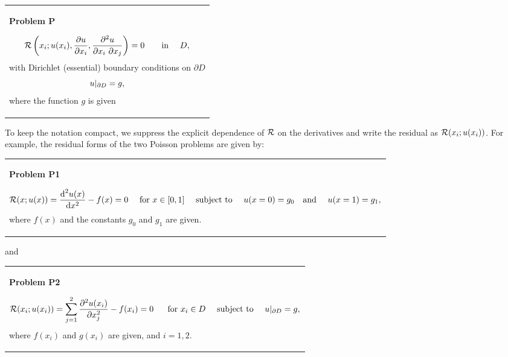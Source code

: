 \begin{center} \tabulinesep=1mm
\begin{longtabu} spread 0pt [c]{*{1}{|X[-1]}|}
\hline
\begin{center} {\bfseries  Problem P } \end{center} 

\begin{center} \[ {\cal R}\left(x_i; u(x_i), \frac{\partial u}{\partial x_i}, \frac{\partial^2 u}{\partial x_i \ \partial x_j}\right) = 0 \ \mbox{ \ \ \ \ in \ \ \ } D,\] with Dirichlet (essential) boundary conditions on $ \partial D $ \[ \hfill u|_{\partial D} = g, \] where the function $g$ is given \end{center}    \\
\end{longtabu}
\end{center} 

To keep the notation compact, we suppress the explicit dependence of $ {\cal R} $ on the derivatives and write the residual as $ {\cal R}(x_i; u(x_i))$. For example, the residual forms of the two Poisson problems are given by\+: \begin{center} \tabulinesep=1mm
\begin{longtabu} spread 0pt [c]{*{1}{|X[-1]}|}
\hline
\begin{center} {\bfseries  Problem P1} \end{center} 

\begin{center} \[ {\cal R}(x; u(x)) = \frac{\mbox{d}^2 u(x)}{\mbox{d} x^2} - f(x) =0 \mbox{\ \ \ \ for $x\in[0,1]$ \ \ \ subject to \ \ \ } u(x=0)= g_0 \mbox{\ \ \ and \ \ \ } u(x=1)= g_1, \] where $ f(x)$ and the constants $g_0$ and $g_1$ are given. \end{center}    \\
\end{longtabu}
\end{center} 

and

\begin{center} \tabulinesep=1mm
\begin{longtabu} spread 0pt [c]{*{1}{|X[-1]}|}
\hline
\begin{center} {\bfseries  Problem P2} \end{center} 

\begin{center} \[ {\cal R}(x_i; u(x_i)) = \sum_{j=1}^2 \frac{\partial^2 u(x_i)}{\partial x_j^2} - f(x_i) =0 \mbox{ \ \ \ \ for $x_i\in D$ \ \ \ subject to \ \ \ } u|_{\partial D} = g, \] where $ f(x_i)$ and $ g(x_i)$ are given, and $ i = 1,2$. \end{center}    \\
\end{longtabu}
\end{center} 

